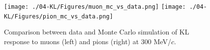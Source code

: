 
   \begin{figure}
   	\begin{center}
   		\texttt{[image: ./04-KL/Figures/muon\_mc\_vs\_data.png]}  		\texttt{[image: ./04-KL/Figures/pion\_mc\_vs\_data.png]}
   		\caption{Comparison between data and Monte Carlo simulation of KL response to muons (left) and pions (right) at 300 MeV/$c$.}
   		\label{fig:KL_mc_vs_data}
   	\end{center}
   \end{figure}
